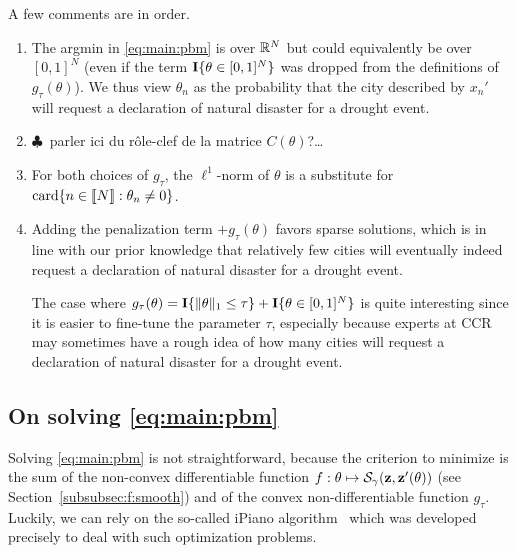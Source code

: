 A few comments are in order.
\begin{enumerate}
\item  The  argmin  in  \eqref{eq:main:pbm}   is  over  $\mathbb{R}^{N}$  but  could
  equivalently     be    over     $[0,1]^{N}$     (even     if    the     term
  $\textbf{I}\{\theta  \in   [0,1]^{N}\}$  was   dropped  from  the   definitions  of
  $g_{\tau}(\theta)$).  We thus view $\theta_{n}$  as the probability that the
  city described  by $x_{n}'$ will  request a declaration of  natural disaster
  for a drought event.
\item $\clubsuit$~parler ici du rôle-clef de la matrice $C(\theta)$?\ldots
\item For  both choices of  $g_{\tau}$, the  $\ell^{1}$-norm of $\theta$  is a
  substitute for $\operatorname{card}\{n \in \llbracket N \rrbracket : \theta_{n} \neq 0\}$.
\item  Adding  the  penalization   term  $+  g_{\tau}(\theta)$  favors  sparse
  solutions, which  is in line  with our  prior knowledge that  relatively few
  cities will eventually indeed request  a declaration of natural disaster for
  a drought event.

  The                                case                                where
  $g_{\tau}  (\theta)  =  \textbf{I}\{\|\theta\|_{1}\leq  \tau\}  +  \textbf{I}\{\theta  \in
  [0,1]^{N}\}$  is quite  interesting  since  it is  easier  to fine-tune  the
  parameter $\tau$,  especially because  experts at CCR  may sometimes  have a
  rough idea of how many cities will request a declaration of natural disaster
  for a drought event.
\end{enumerate}

\subsection{On solving \textbf{\eqref{eq:main:pbm}}}
\label{subsec:solving}

Solving \eqref{eq:main:pbm}  is not straightforward, because  the criterion to
minimize   is   the   sum    of   the   non-convex   differentiable   function
$f:\theta\mapsto      \mathcal{S}_{\gamma}       (\textbf{z},      \textbf{z}'(\theta))$      (see
Section~\ref{subsubsec:f:smooth})   and  of   the  convex   non-differentiable
function  $g_{\tau}$.    Luckily,  we  can   rely  on  the   so-called  iPiano
algorithm~\cite{iPiano}  which  was  developed  precisely to  deal  with  such
optimization problems.

